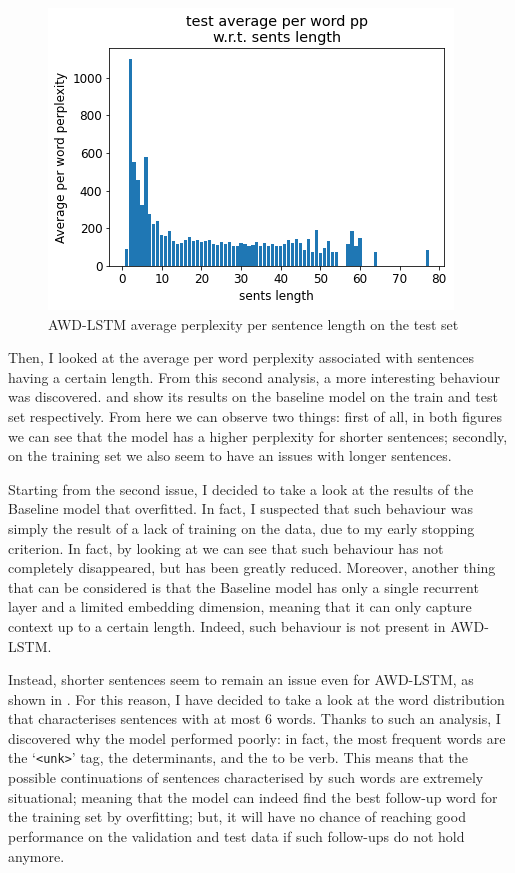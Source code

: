 \begin{figure}[!t]
    \centering
    \includegraphics[scale=0.40]{assets/awdlstm_test_pp_per_length.png}
    \vspace{-1.0em}
    \caption{AWD-LSTM average perplexity per sentence length on the test set}
    \vspace{-1.0em}
    \label{fig:awdlstm-test-pp}
\end{figure}

Then, I looked at the average per word perplexity associated with sentences having a certain length. From this second analysis, a more interesting behaviour was discovered.  and  show its results on the baseline model on the train and test set respectively. From here we can observe two things: first of all, in both figures we can see that the model has a higher perplexity for shorter sentences; secondly, on the training set we also seem to have an issues with longer sentences.

Starting from the second issue, I decided to take a look at the results of the Baseline model that overfitted. In fact, I suspected that such behaviour was simply the result of a lack of training on the data, due to my early stopping criterion. In fact, by looking at  we can see that such behaviour has not completely disappeared, but has been greatly reduced. Moreover, another thing that can be considered is that the Baseline model has only a single recurrent layer and a limited embedding dimension, meaning that it can only capture context up to a certain length. Indeed, such behaviour is not present in AWD-LSTM.

Instead, shorter sentences seem to remain an issue even for AWD-LSTM, as shown in . For this reason, I have decided to take a look at the word distribution that characterises sentences with at most 6 words. Thanks to such an analysis, I discovered why the model performed poorly: in fact, the most frequent words are the `\texttt{<unk>}' tag, the determinants, and the to be verb. This means that the possible continuations of sentences characterised by such words are extremely situational; meaning that the model can indeed find the best follow-up word for the training set by overfitting; but, it will have no chance of reaching good performance on the validation and test data if such follow-ups do not hold anymore.
